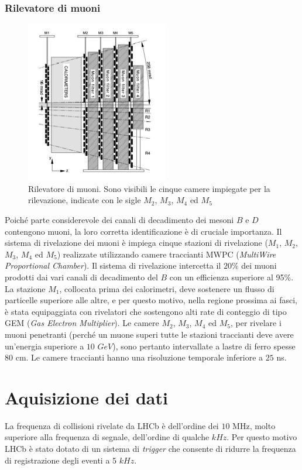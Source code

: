 \subsubsection{Rilevatore di muoni}
\begin{figure}
\centering
\includegraphics[scale=1]{Immagini/muon}
\caption{Rilevatore di muoni. Sono visibili le cinque camere impiegate per la rilevazione, indicate con le sigle $M_2$, $M_3$, $M_4$ ed $M_5$}
\label{fig:muon}
\end{figure}
\noindent
Poiché parte considerevole dei canali di decadimento dei mesoni $B$ e $D$ contengono muoni, la loro corretta identificazione \`e di cruciale importanza.
Il sistema di rivelazione dei muoni \`e impiega cinque stazioni di rivelazione ($M_1$, $M_2$, $M_3$, $M_4$ ed $M_5$) realizzate utilizzando camere traccianti MWPC (\emph{MultiWire Proportional Chamber}). Il sistema di rivelazione intercetta il $20\%$ dei muoni prodotti dai vari canali di decadimento del $B$ con un efficienza superiore al 95\%.
La stazione $M_1$, collocata prima dei calorimetri, deve sostenere un flusso di particelle superiore alle altre, e per questo motivo, nella regione prossima ai fasci, \`e stata  equipaggiata con rivelatori che sostengono alti rate di conteggio di tipo GEM (\emph{Gas Electron Multiplier}). Le camere $M_2$, $M_3$, $M_4$ ed $M_5$, per rivelare i muoni penetranti (perch\'e un muone superi tutte le stazioni traccianti deve avere un'energia superiore a $10$ $GeV$), sono pertanto intervallate a lastre di ferro spesse $80$ cm. Le camere traccianti hanno una risoluzione temporale inferiore a $25$ ns.

\section{Aquisizione dei dati}
\noindent
La frequenza di collisioni rivelate da LHCb \`e dell'ordine dei $10$ MHz, molto superiore alla frequenza di segnale, dell'ordine di qualche $kHz$.
Per questo motivo LHCb \`e stato dotato di un sistema di \emph{trigger} che consente di ridurre la frequenza di registrazione degli eventi a 5 $kHz$.

